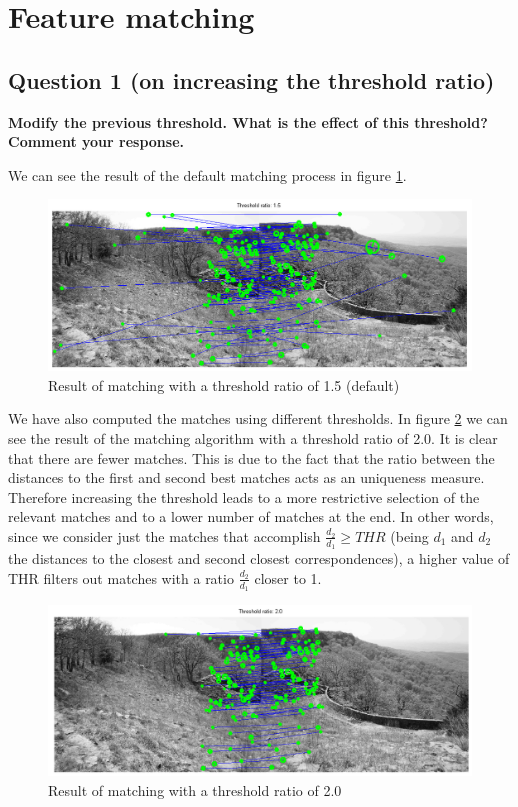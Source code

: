 \section{Feature matching}

\subsection{Question 1 (on increasing the threshold ratio)}

{\bfseries Modify the previous threshold. What is the effect of this
threshold? Comment your response.\\[.5cm]}

We can see the result of the default matching process in figure \ref{fig:matching15thres}.

\begin{figure}[htb]
	\centering
		\includegraphics[width=\textwidth]{./img/ex1/matching_15_thres.png}
	\caption{Result of matching with a threshold ratio of 1.5 (default)}
	\label{fig:matching15thres}
\end{figure}

We have also computed the matches using different thresholds. In figure
\ref{fig:matching20thres} we can see the result of the matching algorithm
with a threshold ratio of 2.0. It is clear that there are fewer matches. This is
due to the fact that the ratio between the distances to the first and second best
matches acts as an uniqueness measure. Therefore increasing the threshold leads
to a more restrictive selection of the relevant matches and to a lower number of
matches at the end. In other words, since we consider just the matches that
accomplish $ \frac{d_2}{d_1} \geq THR $ (being $ d_1 $ and $ d_2 $ the distances
to the closest and second closest correspondences), a higher value of THR filters
out matches with a ratio $ \frac{d_2}{d_1} $ closer to 1.

\begin{figure}[htb]
	\centering
		\includegraphics[width=\textwidth]{./img/ex1/matching_20_thres.png}
	\caption{Result of matching with a threshold ratio of 2.0}
	\label{fig:matching20thres}
\end{figure}

